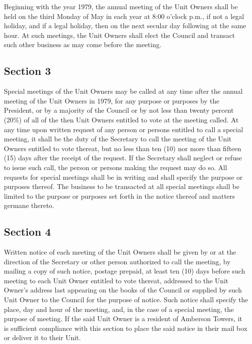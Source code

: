 \documentclass[
  14pt,
]{book}
\begin{document}
Beginning with the year 1979, the annual meeting of the Unit Owners shall be held on the third Monday of May in each year at 8:00 o'clock p.m., if not a legal holiday, and if a legal holiday, then on the next secular day following at the same hour. At such meetings, the Unit Owners shall elect the Council and transact such other business as may come before the meeting.

\hypertarget{section-3}{%
\subsection*{Section 3}\label{section-3}}

Special meetings of the Unit Owners may be called at any time after the annual meeting of the Unit Owners in 1979, for any purpose or purposes by the President, or by a majority of the Council or by not less than twenty percent (20\%) of all of the then Unit Owners entitled to vote at the meeting called. At any time upon written request of any person or persons entitled to call a special meeting, it shall be the duty of the Secretary to call the meeting of the Unit Owners entitled to vote thereat, but no less than ten (10) nor more than fifteen (15) days after the receipt of the request. If the Secretary shall neglect or refuse to issue such call, the person or persons making the request may do so. All requests for special meetings shall be in writing and shall specify the purpose or purposes thereof. The business to be transacted at all special meetings shall be limited to the purpose or purposes set forth in the notice thereof and matters germane thereto.

\hypertarget{section-4}{%
\subsection*{Section 4}\label{section-4}}

Written notice of each meeting of the Unit Owners shall be given by or at the direction of the Secretary or other person authorized to call the meeting, by mailing a copy of such notice, postage prepaid, at least ten (10) days before such meeting to each Unit Owner entitled to vote thereat, addressed to the Unit Owner's address last appearing on the books of the Council or supplied by such Unit Owner to the Council for the purpose of notice. Such notice shall specify the place, day and hour of the meeting, and, in the case of a special meeting, the purpose of meeting. If the said Unit Owner is a resident of Amberson Towers, it is sufficient compliance with this section to place the said notice in their mail box or deliver it to their Unit.
\end{document}
